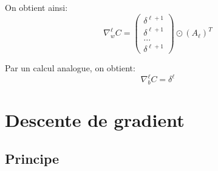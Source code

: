\documentclass[10pt,a4paper,titlepage]{article}
\begin{document}
On obtient ainsi:
\begin{equation}
\label{bp3}
\nabla_w^\ell C = \begin{pmatrix}
\delta^{\ell+1}\\
\delta^{\ell+1}\\
... \\
\delta^{\ell + 1}
\end{pmatrix} \odot (A_\ell)^T
\end{equation}

Par un calcul analogue, on obtient:
\begin{equation}
\label{bp4}
\nabla_b^\ell C = \delta^{\ell}
\end{equation}

\section{Descente de gradient}
\subsection{Principe}
\end{document}
